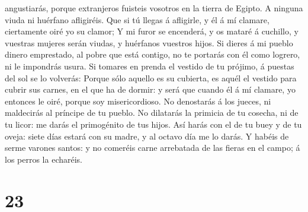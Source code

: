 angustiarás, porque extranjeros fuisteis vosotros en la tierra de
Egipto.  A ninguna viuda ni huérfano afligiréis.
 Que si tú llegas á afligirle, y él á mí clamare,
ciertamente oiré yo su clamor;  Y mi furor se encenderá, y
os mataré á cuchillo, y vuestras mujeres serán viudas, y huérfanos
vuestros hijos.  Si dieres á mi pueblo dinero emprestado,
al pobre que está contigo, no te portarás con él como logrero, ni le
impondrás usura.  Si tomares en prenda el vestido de tu
prójimo, á puestas del sol se lo volverás:  Porque sólo
aquello es su cubierta, es aquél el vestido para cubrir sus carnes, en
el que ha de dormir: y será que cuando él á mí clamare, yo entonces le
oiré, porque soy misericordioso.  No denostarás á los
jueces, ni maldecirás al príncipe de tu pueblo.  No
dilatarás la primicia de tu cosecha, ni de tu licor: me darás el
primogénito de tus hijos.  Así harás con el de tu buey y de
tu oveja: siete días estará con su madre, y al octavo día me lo darás.
 Y habéis de serme varones santos: y no comeréis carne
arrebatada de las fieras en el campo; á los perros la echaréis.

\hypertarget{section-22}{%
\section{23}\label{section-22}}

